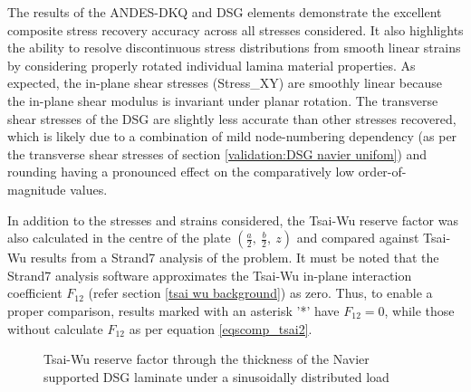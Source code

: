 The results of the ANDES-DKQ and DSG elements demonstrate the excellent composite stress recovery accuracy across all stresses considered. It also highlights the ability to resolve discontinuous stress distributions from smooth linear strains by considering properly rotated individual lamina material properties. As expected, the in-plane shear stresses (Stress\_XY) are smoothly linear because the in-plane shear modulus is invariant under planar rotation. The transverse shear stresses of the DSG are slightly less accurate than other stresses recovered, which is likely due to a combination of mild node-numbering dependency (as per the transverse shear stresses of section \ref{validation:DSG navier unifom}) and rounding having a pronounced effect on the comparatively low order-of-magnitude values.

In addition to the stresses and strains considered, the Tsai-Wu reserve factor was also calculated in the centre of the plate $(\frac{a}{2},\ \frac{b}{2},\ z)$ and compared against Tsai-Wu results from a Strand7 analysis of the problem. It must be noted that the Strand7 analysis software approximates the Tsai-Wu in-plane interaction coefficient $F_{12}$ (refer section \ref{tsai wu background}) as zero. Thus, to enable a proper comparison, results marked with an asterisk '*' have $F_{12} = 0$, while those without calculate $F_{12}$ as per equation \ref{eqscomp_tsai2}.

\begin{figure}[H]
	\caption{\label{Navier_tri_composite_trans}Tsai-Wu reserve factor through the thickness of the Navier supported DSG laminate under a sinusoidally distributed load}
\end{figure}

